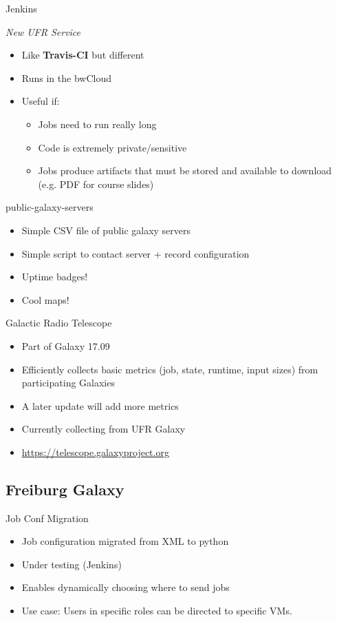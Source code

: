 \documentclass[12pt]{ufrslides}
\begin{document}
	\begin{frame}{Jenkins}
		\begin{center}
			\emph{New UFR Service}
		\end{center}
		\begin{itemize}
			\item Like \textbf{Travis-CI} but different
			\item Runs in the bwCloud
			\item Useful if:
				\begin{itemize}
					\item Jobs need to run really long
					\item Code is extremely private/sensitive
					\item Jobs produce artifacts that must be stored and
						available to download (e.g. PDF for course slides)
				\end{itemize}
		\end{itemize}
	\end{frame}

	\begin{frame}{public-galaxy-servers}
		\begin{itemize}
			\item Simple CSV file of public galaxy servers
			\item Simple script to contact server + record configuration
			\item Uptime badges! %
			\item Cool maps!
		\end{itemize}
	\end{frame}

	\begin{frame}{Galactic Radio Telescope}
		\begin{itemize}
			\item Part of Galaxy 17.09
			\item Efficiently collects basic metrics (job, state, runtime, input sizes) from participating Galaxies
			\item A later update will add more metrics
			\item Currently collecting from UFR Galaxy
			\item \url{https://telescope.galaxyproject.org}
		\end{itemize}
	\end{frame}

\subsection{Freiburg Galaxy}
	\begin{frame}{Job Conf Migration}
		\begin{itemize}
			\item Job configuration migrated from XML to python
			\item Under testing (Jenkins)
			\item Enables dynamically choosing where to send jobs
			\item Use case: Users in specific roles can be directed to specific VMs.
		\end{itemize}
	\end{frame}
\end{document}
